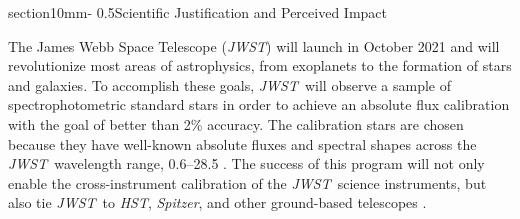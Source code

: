 \documentclass[letterpaper,12pt]{article}
\makeatletter
\renewcommand{\section}{\@startsection%
{section}{1}{0mm}{-\baselineskip}%
{0.5\baselineskip}{\normalfont\large\bfseries}}%
\newcommand{\jwst}{{\it JWST}}
\newcommand{\spitzer}{{\it Spitzer}}
\newcommand{\hst}{{\it HST}}
\newcommand{\swift}{{\it Swift}}
\newcommand{\fermi}{{\it Fermi}}
\newcommand{\mum}{\ifmmode{\rm \mu m}\else{$\mu$m}\fi}
\makeatother
\begin{document}




\section{Scientific Justification and Perceived Impact}

The James Webb Space Telescope (\jwst) will launch in October 2021 and will revolutionize most areas of astrophysics, from exoplanets to the formation of stars and galaxies. To accomplish these goals, \jwst\ will observe a sample of spectrophotometric standard stars in order to achieve an absolute flux calibration with the goal of better than 2\% accuracy.  The calibration stars are chosen because they have well-known absolute fluxes and spectral shapes across the \jwst\ wavelength range, 0.6--28.5 \mum.  The success of this program will not only enable the cross-instrument calibration of the \jwst\ science instruments, but also tie \jwst\ to \hst, \spitzer, and other ground-based telescopes \citep{Bohlin2014PASP}. 
\end{document}
